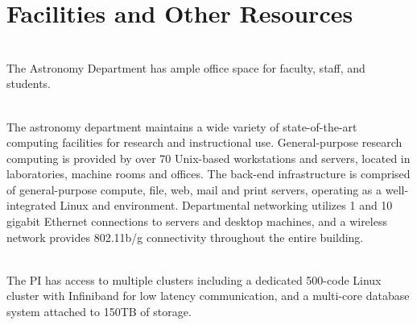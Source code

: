 \documentclass[prd,nofootbib,floatfix,11pt,tightenlines,nofootinbib]{revtex4}
\begin{document}
\begin{thebibliography}{99}






\end{thebibliography} 

\newpage

\section*{Facilities and Other Resources}

\\
The Astronomy Department has ample office
space for faculty, staff, and students. 

\\
The astronomy department maintains a wide variety of state-of-the-art
computing facilities for research and instructional use. General-purpose research computing is provided by over 70 
Unix-based workstations and servers, located in laboratories, machine rooms and offices. The
back-end infrastructure is comprised of general-purpose compute, file, web, mail and print
servers, operating as a well-integrated Linux and environment. Departmental
networking utilizes 1 and 10 gigabit Ethernet connections to servers and desktop machines, and a
wireless network provides 802.11b/g connectivity throughout the entire building.

\\
The PI has  access to multiple clusters including a dedicated 500-code Linux cluster with Infiniband for low latency
communication, and a multi-core database system attached to 150TB of
storage. 


\label{lastpage}
\end{document}
